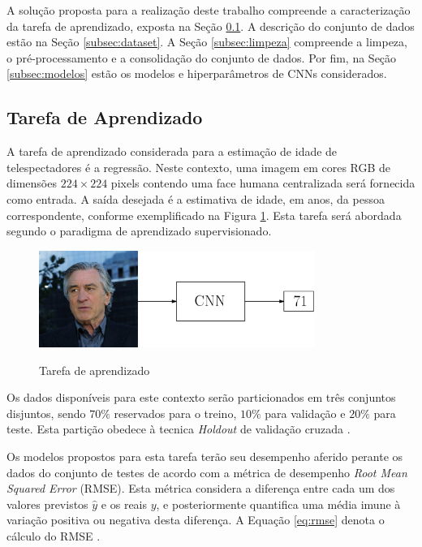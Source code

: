 A solução proposta para a realização deste trabalho compreende a caracterização da tarefa de aprendizado, exposta na Seção \ref{subsec:tarefa}. A descrição do conjunto de dados estão na Seção \ref{subsec:dataset}. A Seção \ref{subsec:limpeza} compreende a limpeza, o pré-processamento e a consolidação do conjunto de dados. Por fim, na Seção \ref{subsec:modelos} estão os modelos e hiperparâmetros de CNNs considerados.
\subsection{Tarefa de Aprendizado}\label{subsec:tarefa}
A tarefa de aprendizado considerada para a estimação de idade de telespectadores é a regressão. Neste contexto, uma imagem em cores RGB de dimensões $224 \times 224$ pixels contendo uma face humana centralizada será fornecida como entrada. A saída desejada é a estimativa de idade, em anos, da pessoa correspondente, conforme exemplificado na Figura \ref{fig:deniro_cnn}. Esta tarefa será abordada segundo o paradigma de aprendizado supervisionado.

\begin{figure}[h!]
  \centering
     \caption{Tarefa de aprendizado}
     \includegraphics[width=0.8\textwidth]{img/deniro_cnn}
     \label{fig:deniro_cnn}
\end{figure}

Os dados disponíveis para este contexto serão particionados em três conjuntos disjuntos, sendo $70\%$ reservados para o treino, $10\%$ para validação e $20\%$ para teste. Esta partição obedece à tecnica \emph{Holdout} de validação cruzada \cite{brink2016real}.

Os modelos propostos para esta tarefa terão seu desempenho aferido perante os dados do conjunto de testes de acordo com a métrica de desempenho \emph{Root Mean Squared Error} (RMSE). Esta métrica considera a diferença entre cada um dos valores previstos $\hat{y}$ e os reais $y$, e posteriormente quantifica uma média imune à variação positiva ou negativa desta diferença. A Equação \ref{eq:rmse} denota o cálculo do RMSE \cite{brink2016real}.


